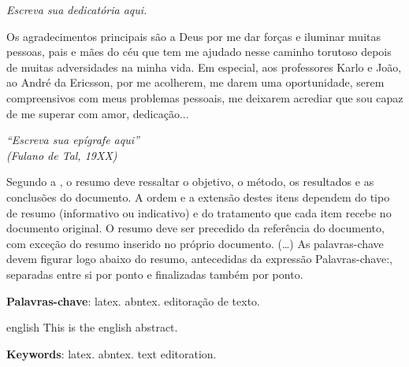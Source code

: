 \documentclass[
	12pt,				%
	openright,			%
	oneside,			%
	a4paper,			%
	english,			%
	brazil				%
	]{abntex2}
\begin{document}
\begin{dedicatoria}
   \vspace*{\fill}
   \centering
   \noindent
   \textit{ Escreva sua dedicatória aqui.} \vspace*{\fill}
\end{dedicatoria}

\begin{agradecimentos}
Os agradecimentos principais são a Deus por me dar forças e iluminar muitas pessoas, pais e mães do céu que tem me ajudado nesse caminho torutoso depois de muitas adversidades na minha vida. Em especial, aos professores Karlo e João, ao André da Ericsson, por me acolherem, me darem uma oportunidade, serem compreensivos com meus problemas pessoais, me deixarem acrediar que sou capaz de me superar com amor, dedicação...  

\end{agradecimentos}

\begin{epigrafe}
    \vspace*{\fill}
	\begin{flushright}
		\textit{``Escreva sua epígrafe aqui''\\
		(Fulano de Tal, 19XX)}
	\end{flushright}
\end{epigrafe}


\setlength{\absparsep}{18pt} %
\begin{resumo}
 Segundo a \cite{NBR6028:2003}, o resumo deve ressaltar o
 objetivo, o método, os resultados e as conclusões do documento. A ordem e a extensão
 destes itens dependem do tipo de resumo (informativo ou indicativo) e do
 tratamento que cada item recebe no documento original. O resumo deve ser
 precedido da referência do documento, com exceção do resumo inserido no
 próprio documento. (\ldots) As palavras-chave devem figurar logo abaixo do
 resumo, antecedidas da expressão Palavras-chave:, separadas entre si por
 ponto e finalizadas também por ponto.

 \textbf{Palavras-chave}: latex. abntex. editoração de texto.
\end{resumo}

\begin{resumo}[Abstract]
 \begin{otherlanguage*}{english}
   This is the english abstract.

   \vspace{\onelineskip}
 
   \noindent 
   \textbf{Keywords}: latex. abntex. text editoration.
 \end{otherlanguage*}
\end{resumo}
\end{document}
